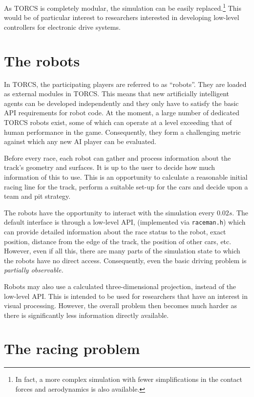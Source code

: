 \documentclass[a4paper]{article}
\begin{document}
As TORCS is completely modular, the simulation can be easily replaced.\footnote{In fact, a more complex simulation with fewer simplifications in the contact forces and aerodynamics is also available.}
This would be of particular interest to researchers interested in developing low-level controllers for electronic drive systems. 

\section{The robots}

In TORCS, the participating players are referred to as ``robots''. They are loaded as external modules in TORCS. This means that new artificially intelligent agents can be developed independently and they only have to satisfy the basic API requirements for robot code. At the moment, a large number of dedicated TORCS robots exist, some of which can operate at a level exceeding that of human performance in the game. Consequently, they form a challenging metric against which any new AI player can be evaluated.

Before every race, each robot can gather and process information about the track's geometry and surfaces. It is up to the user to decide how much information of this to use. This is an opportunity to calculate a reasonable initial racing line for the track, perform a suitable set-up for the cars and decide upon a team and pit strategy.

The robots have the opportunity to interact with the simulation every $0.02s$. The default interface is through a low-level API,
(implemented via \texttt{raceman.h}) which can provide detailed information about the race status to the robot, exact position, distance from the edge of the track, the position of other cars, etc. However, even if all this, there are many parts of the simulation state to which the robots have no direct access. Consequently, even the basic driving problem is \emph{partially observable.}

Robots may also use a calculated three-dimensional projection, instead of the low-level API. This is intended to be used for researchers that have an interest in visual processing. However, the overall problem then becomes much harder as there is significantly less information directly available. 

\section{The racing problem}
\end{document}
